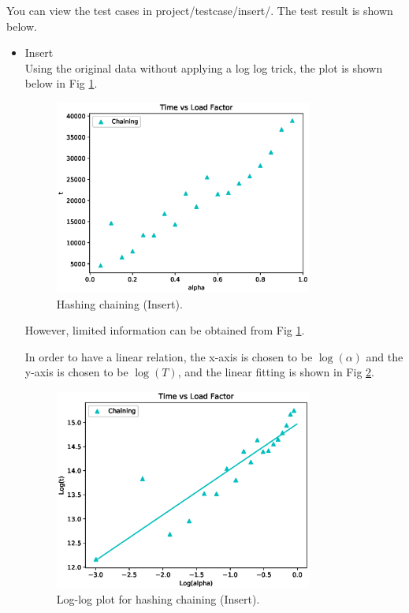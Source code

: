 \documentclass{article}
\begin{document}
\begin{spacing}{1.2}
You can view the test cases in project/testcase/insert/. The test result is shown below.
\begin{itemize}
    \item Insert\\
    Using the original data without applying a log log trick, the plot is shown below in Fig \ref{chain-origin}.
    \begin{figure}[!htb]
        \centering
        \includegraphics[width=0.8\textwidth]{../output/fig/insert_original_chain.eps}
        \caption{Hashing chaining (Insert).}
        \label{chain-origin}
    \end{figure}
    However, limited information can be obtained from Fig \ref{chain-origin}.

    In order to have a linear relation, the x-axis is chosen to be $\log(\alpha)$ and the y-axis is chosen to be $\log(T)$, and the linear fitting is shown in Fig \ref{chain-set}.
    \begin{figure}[!htb]
        \centering
        \includegraphics[width=0.8\textwidth]{../output/fig/insert_chain.eps}
        \caption{Log-log plot for hashing chaining (Insert).}
        \label{chain-set}
    \end{figure}


\end{itemize}
\end{spacing}
\end{document}

